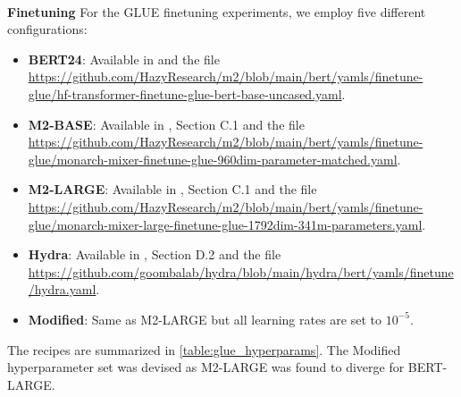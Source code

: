 {\\
\textbf{Finetuning} For the GLUE finetuning experiments, we employ five different configurations:
\begin{itemize}
    \item \textbf{BERT24}: Available in \citet{izsak2021train} and the file  \url{https://github.com/HazyResearch/m2/blob/main/bert/yamls/finetune-glue/hf-transformer-finetune-glue-bert-base-uncased.yaml}.
    \item \textbf{M2-BASE}: Available in \citet{fu2023monarch}, Section C.1 and the file \url{https://github.com/HazyResearch/m2/blob/main/bert/yamls/finetune-glue/monarch-mixer-finetune-glue-960dim-parameter-matched.yaml}.
    \item \textbf{M2-LARGE}: Available in \citet{fu2023monarch}, Section C.1 and the file \url{https://github.com/HazyResearch/m2/blob/main/bert/yamls/finetune-glue/monarch-mixer-large-finetune-glue-1792dim-341m-parameters.yaml}.
    \item \textbf{Hydra}: Available in \citet{hwang2024hydrabidirectionalstatespace}, Section D.2 and the file \url{https://github.com/goombalab/hydra/blob/main/hydra/bert/yamls/finetune/hydra.yaml}.
    \item \textbf{Modified}: Same as M2-LARGE but all learning rates are set to $10^{-5}$.
\end{itemize}
The recipes are summarized in \cref{table:glue_hyperparams}. The Modified hyperparameter set was devised as M2-LARGE was found to diverge for BERT-LARGE.
\begin{table}[]
\end{table}}
